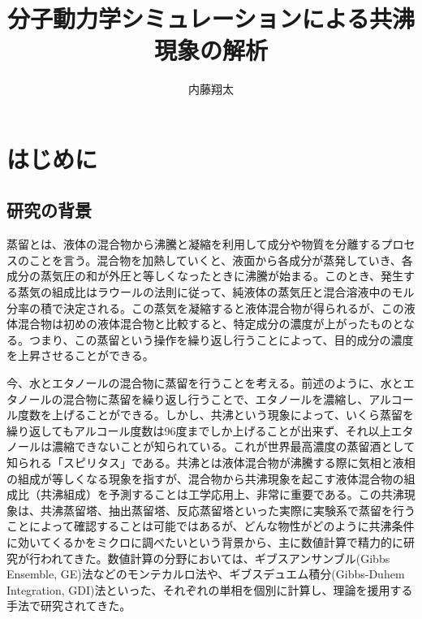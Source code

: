 \documentclass[titlepage]{jsreport}
\title{分子動力学シミュレーションによる共沸現象の解析}
\author{内藤翔太}
\begin{document}
\maketitle
{}

\setcounter{tocdepth}{3}
\tableofcontents
\pagestyle{plain}

\chapter{はじめに} \label{chap:introduction}


\section{研究の背景} \label{introduction:background}
蒸留とは、液体の混合物から沸騰と凝縮を利用して成分や物質を分離するプロセスのことを言う\cite{distillation-book}。混合物を加熱していくと、液面から各成分が蒸発していき、各成分の蒸気圧の和が外圧と等しくなったときに沸騰が始まる。このとき、発生する蒸気の組成比はラウールの法則に従って、純液体の蒸気圧と混合溶液中のモル分率の積で決定される\cite{raoul}。この蒸気を凝縮すると液体混合物が得られるが、この液体混合物は初めの液体混合物と比較すると、特定成分の濃度が上がったものとなる。つまり、この蒸留という操作を繰り返し行うことによって、目的成分の濃度を上昇させることができる。

今、水とエタノールの混合物に蒸留を行うことを考える。前述のように、水とエタノールの混合物に蒸留を繰り返し行うことで、エタノールを濃縮し、アルコール度数を上げることができる。しかし、共沸という現象によって、いくら蒸留を繰り返してもアルコール度数は96度までしか上げることが出来ず、それ以上エタノールは濃縮できないことが知られている。これが世界最高濃度の蒸留酒として知られる「スピリタス」である\cite{spirytus}。共沸とは液体混合物が沸騰する際に気相と液相の組成が等しくなる現象を指す\cite{azeotrope}が、混合物から共沸現象を起こす液体混合物の組成比（共沸組成）を予測することは工学応用上、非常に重要である。この共沸現象は、共沸蒸留塔\cite{azeotropic-distillation-1,azeotropic-distillation-2}、抽出蒸留塔\cite{extractive-distillation-1,extractive-distillation-2}、反応蒸留塔\cite{reactive-distillation-1,reactive-distillation-2}といった実際に実験系で蒸留を行うことによって確認することは可能ではあるが、どんな物性がどのように共沸条件に効いてくるかをミクロに調べたいという背景から、主に数値計算で精力的に研究が行われてきた。数値計算の分野においては、ギブスアンサンブル(Gibbs Ensemble, GE)法\cite{gibbs-ensemble-1,gibbs-ensemble-2}などのモンテカルロ法や、ギブスデュエム積分(Gibbs-Duhem Integration, GDI)法\cite{gibbs-duhem-integration-1,gibbs-duhem-integration-2}といった、それぞれの単相を個別に計算し、理論を援用する手法で研究されてきた。
\end{document}
